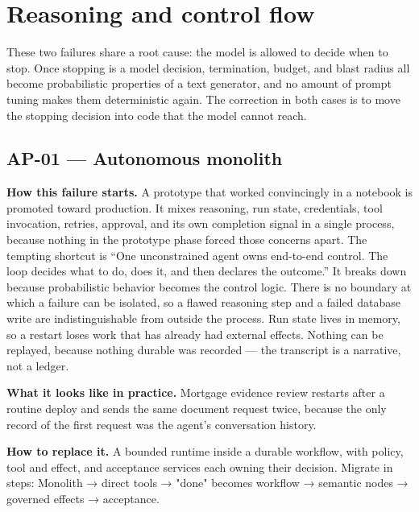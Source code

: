 \section{Reasoning and control flow}

These two failures share a root cause: the model is allowed to decide when to stop. Once stopping is a model decision, termination, budget, and blast radius all become probabilistic properties of a text generator, and no amount of prompt tuning makes them deterministic again. The correction in both cases is to move the stopping decision into code that the model cannot reach.\par

\subsection{AP-01 — Autonomous monolith}


\textbf{How this failure starts.} A prototype that worked convincingly in a notebook is promoted toward production. It mixes reasoning, run state, credentials, tool invocation, retries, approval, and its own completion signal in a single process, because nothing in the prototype phase forced those concerns apart. The tempting shortcut is “One unconstrained agent owns end-to-end control. The loop decides what to do, does it, and then declares the outcome.” It breaks down because probabilistic behavior becomes the control logic. There is no boundary at which a failure can be isolated, so a flawed reasoning step and a failed database write are indistinguishable from outside the process. Run state lives in memory, so a restart loses work that has already had external effects. Nothing can be replayed, because nothing durable was recorded — the transcript is a narrative, not a ledger.\par

\textbf{What it looks like in practice.} Mortgage evidence review restarts after a routine deploy and sends the same document request twice, because the only record of the first request was the agent's conversation history.\par

\textbf{How to replace it.} A bounded runtime inside a durable workflow, with policy, tool and effect, and acceptance services each owning their decision. Migrate in steps: Monolith → direct tools → "done" becomes workflow → semantic nodes → governed effects → acceptance.\par

